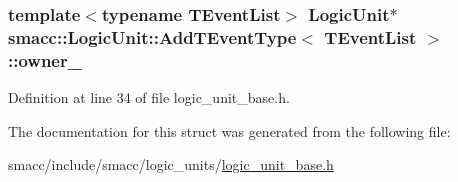 \subsubsection[{\texorpdfstring{owner\+\_\+}{owner_}}]{\setlength{\rightskip}{0pt plus 5cm}template$<$typename T\+Event\+List$>$ {\bf Logic\+Unit}$\ast$ {\bf smacc\+::\+Logic\+Unit\+::\+Add\+T\+Event\+Type}$<$ T\+Event\+List $>$\+::owner\+\_\+}\hypertarget{structsmacc_1_1LogicUnit_1_1AddTEventType_a6da43b333ecdf77bde453cd289b4d325}{}\label{structsmacc_1_1LogicUnit_1_1AddTEventType_a6da43b333ecdf77bde453cd289b4d325}


Definition at line 34 of file logic\+\_\+unit\+\_\+base.\+h.



The documentation for this struct was generated from the following file\+:\begin{DoxyCompactItemize}
\item 
smacc/include/smacc/logic\+\_\+units/\hyperlink{logic__unit__base_8h}{logic\+\_\+unit\+\_\+base.\+h}\end{DoxyCompactItemize}

